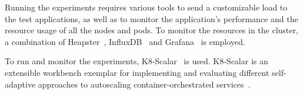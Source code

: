 Running the experiments requires various tools to send a customizable load to the test applications, as well as to monitor the application's performance and the resource usage of all the nodes and pods. 
%
To monitor the resources in the cluster, a combination of Heapster~\citep{heapster}, InfluxDB~\citep{influxdb} and Grafana~\citep{grafana} is employed. 

To run and monitor the experiments, K8-Scalar~\citep{scalar} is used. K8-Scalar is an extensible workbench exemplar for implementing and evaluating different self-adaptive approaches to autoscaling container-orchestrated services~\citep{scalar-github-overview}. 
%
%
